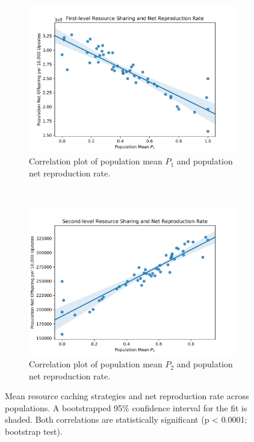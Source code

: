 \begin{figure}
\begin{center}

\begin{subfigure}[b]{\columnwidth}
  \includegraphics[width=\columnwidth]{img/mean_res_pool1_vs_net_reproduction}
  \caption{
  Correlation plot of population mean $P_1$ and population net reproduction rate.
  }
  \label{fig:mean_res_pool1_vs_net_reproduction}
\end{subfigure}
~~
\begin{subfigure}[b]{\columnwidth}
  \includegraphics[width=\columnwidth]{img/mean_res_pool2_vs_net_reproduction}
  \caption{
  Correlation plot of population mean $P_2$ and population net reproduction rate.
  }
  \label{fig:mean_res_pool2_vs_net_reproduction}
\end{subfigure}
\caption{
Mean resource caching strategies and net reproduction rate across populations.
A bootstrapped 95\% confidence interval for the fit is shaded.
Both correlations are statistically significant (p < 0.0001; bootstrap test).
}
\label{fig:net_reproduction}
\end{center}
\end{figure}
